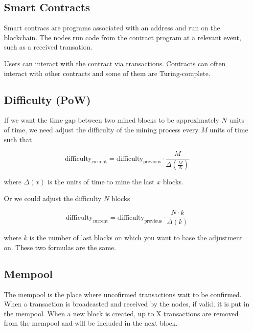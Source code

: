 \documentclass[../documentation.tex]{subfiles}
\begin{document}
\subsection{Smart Contracts}

Smart contracs are programs associated with an address and run on the blockchain.
The nodes run code from the contract program at a relevant event, such as a received transation.

Users can interact with the contract via transactions. Contracts can often interact with other contracts
and some of them are Turing-complete.

%
%

\subsection{Difficulty (PoW)}

If we want the time gap between two mined blocks to be approximately
\(N\) units of time, we need adjust the difficulty of the mining process every 
\(M\) units of time such that

\[
    \text{difficulty}_\text{current} =
    \text{difficulty}_\text{previous}
    \cdot \frac{M}{\Delta (\frac{M}{N})}
\]

where \(\Delta (x)\) is the units of time to mine the last \(x\) blocks.

Or we could adjust the difficulty \(N\) blocks

\[
    \text{difficulty}_\text{current} =
    \text{difficulty}_\text{previous}
    \cdot \frac{N \cdot k}{\Delta(k)}
\]

where \(k\) is the number of last blocks on which you want to
base the adjustment on. These two formulas are the same.

\subsection{Mempool}

The mempool is the place where uncofirmed transactions
wait to be confirmed.
When a transaction is broadcasted and received by the nodes,
if valid, it is put in the mempool.
When a new block is created, up to X transactions are removed from the
mempool and will be included in the next block.
\end{document}
